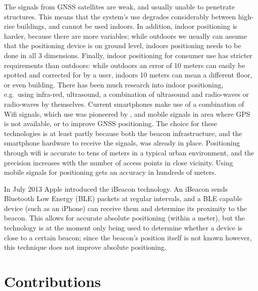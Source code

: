 The signals from GNSS satellites are weak, and usually unable to penetrate structures.
This means that the system's use degrades considerably between high-rise buildings, and cannot be used indoors.
In addition, indoor positioning is harder, because there are more variables; while outdoors we usually can assume that the positioning device is on ground level, indoors positioning needs to be done in all 3 dimensions.
Finally, indoor positioning for consumer use has stricter requirements than outdoors: while outdoors an error of 10 meters can easily be spotted and corrected for by a user, indoors 10 meters can mean a different floor, or even building. 
There has been much research into indoor positioning, e.g.\ using infra-red\citep{want1992active}, ultrasound\citep{harter2002anatomy}, a combination of ultrasound and radio-waves\citep{priyantha2000cricket} or radio-waves by themselves\citep{lorincz2005motetrack}.
Current smartphones make use of a combination of Wifi signals, which use was pioneered by \citet{bahl2000enhancements}, and mobile signals in area where GPS is not available, or to improve GNSS positioning.
The choice for these technologies is at least partly because both the beacon infrastructure, and the smartphone hardware to receive the signals, was already in place.
Positioning through wifi is accurate to tens of meters in a typical urban environment\citep{zandbergen2009accuracy}, and the precision increases with the number of access points in close vicinity.
Using mobile signals for positioning gets an accuracy in hundreds of meters.

In July 2013 Apple introduced the iBeacon technology.
An iBeacon sends Bluetooth Low Energy (BLE) packets at regular intervals, and a BLE capable device (such as an iPhone) can receive them and determine its proximity to the beacon.
This allows for accurate absolute positioning (within a meter), but the technology is at the moment only being used to determine whether a device is close to a certain beacon; since the beacon's position itself is not known however, this technique does not improve absolute positioning.

\section{Contributions}

